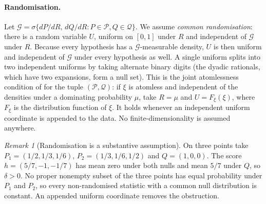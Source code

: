 \documentclass[11pt,a4paper]{article}
\theoremstyle{definition}
\theoremstyle{remark}
\newtheorem{remark}[theorem]{Remark}
\newcommand{\PP}{\mathcal P}
\newcommand{\QQ}{\mathcal Q}
\begin{document}
\paragraph{Randomisation.}
Let \(\mathcal G=\sigma\{dP/dR,\,dQ/dR:P\in\PP,Q\in\QQ\}\). We assume \emph{common randomisation}: there is a random variable \(U\), uniform on \([0,1]\) under \(R\) and independent of \(\mathcal G\) under \(R\). Because every hypothesis has a \(\mathcal G\)-measurable density, \(U\) is then uniform and independent of \(\mathcal G\) under every hypothesis as well. A single uniform splits into two independent uniforms by taking alternate binary digits (the dyadic rationals, which have two expansions, form a null set). This is the joint atomlessness condition of \cite[Definition~2.2]{ZRW} for the tuple \((\PP,\QQ)\): if \(\xi\) is atomless and independent of the densities under a dominating probability \(\mu\), take \(R=\mu\) and \(U=F_\xi(\xi)\), where \(F_\xi\) is the distribution function of \(\xi\). It holds whenever an independent uniform coordinate is appended to the data. No finite-dimensionality is assumed anywhere.

\begin{remark}[Randomisation is a substantive assumption]
On three points take \(P_1=(1/2,1/3,1/6)\), \(P_2=(1/3,1/6,1/2)\) and \(Q=(1,0,0)\). The score \(h=(5/7,-1,-1/7)\) has mean zero under both nulls and mean \(5/7\) under \(Q\), so \(\delta>0\). No proper nonempty subset of the three points has equal probability under \(P_1\) and \(P_2\), so every non-randomised statistic with a common null distribution is constant. An appended uniform coordinate removes the obstruction.
\end{remark}
\end{document}
